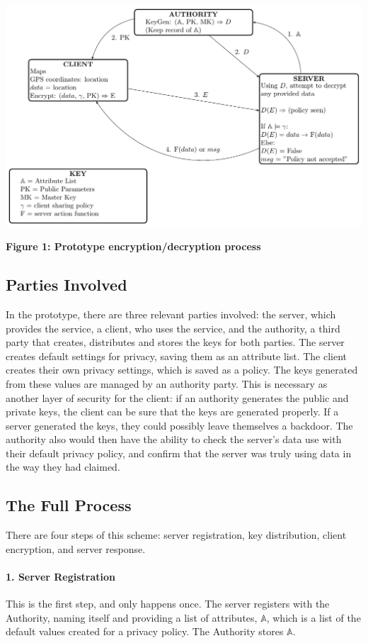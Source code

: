 \documentclass[12pt]{article}
\begin{document}
\includegraphics[scale=.7]{policydiagram.pdf}
\begin{center}
\textbf{Figure 1: Prototype encryption/decryption process}
\end{center}

\subsection{Parties Involved}
In the prototype, there are three relevant parties involved: the server, which provides the service, a client, who uses the service, and the authority, a third party that creates, distributes and stores the keys for both parties. The server creates default settings for privacy, saving them as an attribute list. The client creates their own privacy settings, which is saved as a policy. The keys generated from these values are managed by an authority party. This is necessary as another layer of security for the client: if an authority generates the public and private keys, the client can be sure that the keys are generated properly. If a server generated the keys, they could possibly leave themselves a backdoor. The authority also would then have the ability to check the server's data use with their default privacy policy, and confirm that the server was truly using data in the way they had claimed. 

\subsection{The Full Process}
There are four steps of this scheme: server registration, key distribution, client encryption, and server response.

\paragraph{1. Server Registration}
This is the first step, and only happens once. The server registers with the Authority, naming itself and providing a list of attributes, $\mathbb{A}$, which is a list of the default values created for a privacy policy. The Authority stores $\mathbb{A}$.
\end{document}
